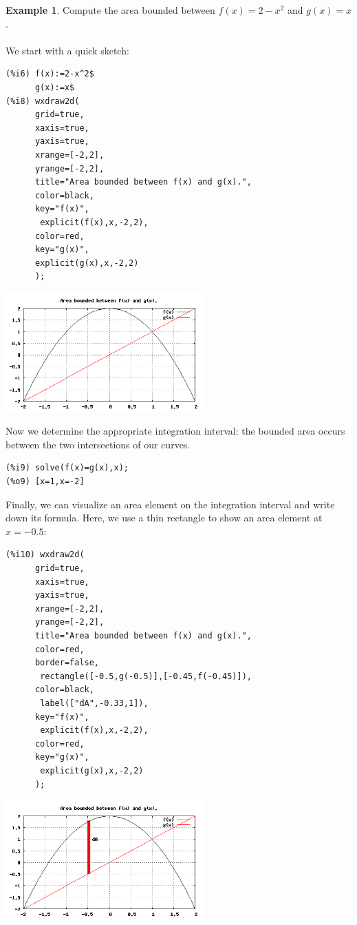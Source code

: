 \documentclass[10.5pt,twoside]{report}
\theoremstyle{definition}
\newtheorem{exmp}{Example}[section]
\begin{document}
\begin{exmp}  Compute the area bounded between $f(x)=2-x^2$ and $g(x)=x$.\\
${}$\\

We start with a quick sketch:

\begin{verbatim}
(%i6) f(x):=2-x^2$
      g(x):=x$
(%i8) wxdraw2d(
      grid=true,
      xaxis=true,
      yaxis=true,
      xrange=[-2,2],
      yrange=[-2,2],
      title="Area bounded between f(x) and g(x).",
      color=black,
      key="f(x)",
       explicit(f(x),x,-2,2),
      color=red,
      key="g(x)",
      explicit(g(x),x,-2,2)
      );
\end{verbatim}

\includegraphics[width=3in]{example_7_3_1_2_1}

Now we determine the appropriate integration interval:  the bounded area occurs between the two intersections of our curves.

\begin{verbatim}
(%i9) solve(f(x)=g(x),x);
(%o9) [x=1,x=-2]
\end{verbatim}


Finally, we can visualize an area element on the integration interval and write down its formula.  Here, we use a thin rectangle to show an area element at $x=-0.5$:

\begin{verbatim}
(%i10) wxdraw2d(
      grid=true,
      xaxis=true,
      yaxis=true,
      xrange=[-2,2],
      yrange=[-2,2],
      title="Area bounded between f(x) and g(x).",
      color=red,
      border=false,
       rectangle([-0.5,g(-0.5)],[-0.45,f(-0.45)]),
      color=black,
       label(["dA",-0.33,1]),
      key="f(x)",
       explicit(f(x),x,-2,2),
      color=red,
      key="g(x)",
       explicit(g(x),x,-2,2)
      );
\end{verbatim}


\includegraphics[width=3in]{example_7_3_1_2_2}



\end{exmp}
\end{document}

